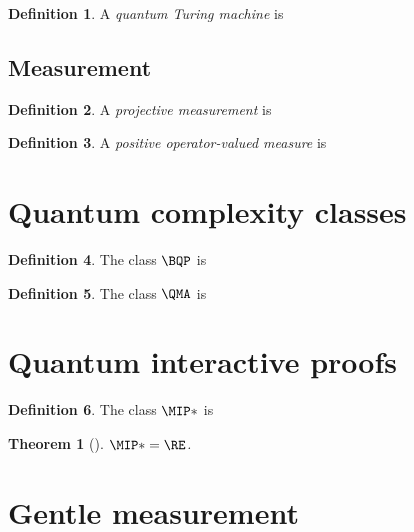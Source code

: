 \documentclass[english,12pt]{reedthesis}
\theoremstyle{plain}
\newtheorem{thm}{Theorem}[section]
\theoremstyle{definition}
\newtheorem{defn}[defn]{Definition}
\theoremstyle{remark}
\begin{document}
\begin{defn}\label{def:quantum-tm}
  A \emph{quantum Turing machine} is
\end{defn}

\subsection{Measurement}

\begin{defn}\label{def:projective-measure}
  A \emph{projective measurement} is
\end{defn}

\begin{defn}\label{def:povm}
  A \emph{positive operator-valued measure} is
\end{defn}

\section{Quantum complexity classes}

\begin{defn}\label{def:bqp}
  The class $\BQP$ is
\end{defn}

\begin{defn}\label{def:qma}
  The class $\QMA$ is
\end{defn}

\section{Quantum interactive proofs}\label{sec:quant-interactive}

\begin{defn}\label{def:mip-star}
  The class $\MIP*$ is
\end{defn}

\begin{thm}[{\cite{JNVWY21}}]\label{thm:mip-star-is-re}
  $\MIP* = \RE$.
\end{thm}

\section{Gentle measurement}\label{sec:gentle-measurement}
\end{document}
